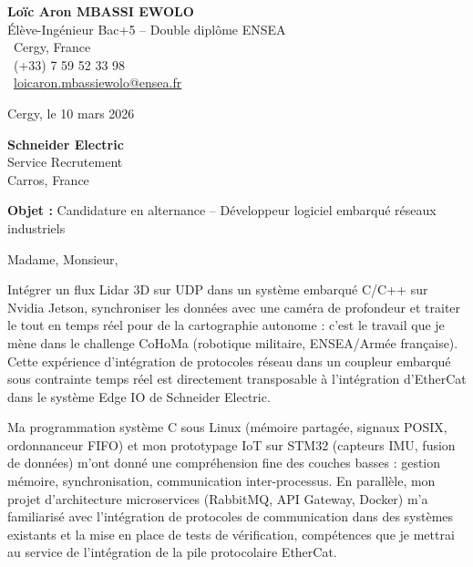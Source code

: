 \documentclass[a4paper,11pt]{article}
\begin{document}
\noindent
\begin{minipage}[t]{0.5\textwidth}
    \textbf{Loïc Aron MBASSI EWOLO}\\
    Élève-Ingénieur Bac+5 -- Double diplôme ENSEA\\[3pt]
    \faMapMarker\ Cergy, France\\
    \faPhone\ (+33) 7 59 52 33 98\\
    \faEnvelope\ \href{mailto:loicaron.mbassiewolo@ensea.fr}{loicaron.mbassiewolo@ensea.fr}
\end{minipage}
\hfill
\begin{minipage}[t]{0.4\textwidth}
    \raggedleft
    Cergy, le 10 mars 2026
\end{minipage}

\vspace{1.2cm}

\hfill
\begin{minipage}[t]{0.5\textwidth}
    \raggedleft
    \textbf{Schneider Electric}\\
    Service Recrutement\\
    Carros, France
\end{minipage}

\vspace{1cm}

\noindent\textbf{Objet :} Candidature en alternance -- Développeur logiciel embarqué réseaux industriels

\vspace{0.8cm}

Madame, Monsieur,

Intégrer un flux Lidar 3D sur UDP dans un système embarqué C/C++ sur Nvidia Jetson, synchroniser les données avec une caméra de profondeur et traiter le tout en temps réel pour de la cartographie autonome : c'est le travail que je mène dans le challenge CoHoMa (robotique militaire, ENSEA/Armée française). Cette expérience d'intégration de protocoles réseau dans un coupleur embarqué sous contrainte temps réel est directement transposable à l'intégration d'EtherCat dans le système Edge IO de Schneider Electric.

Ma programmation système C sous Linux (mémoire partagée, signaux POSIX, ordonnanceur FIFO) et mon prototypage IoT sur STM32 (capteurs IMU, fusion de données) m'ont donné une compréhension fine des couches basses : gestion mémoire, synchronisation, communication inter-processus. En parallèle, mon projet d'architecture microservices (RabbitMQ, API Gateway, Docker) m'a familiarisé avec l'intégration de protocoles de communication dans des systèmes existants et la mise en place de tests de vérification, compétences que je mettrai au service de l'intégration de la pile protocolaire EtherCat.
\end{document}
